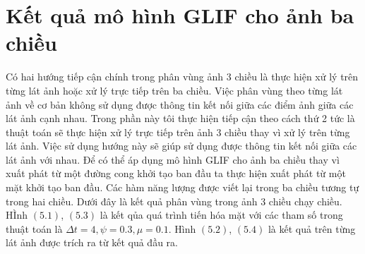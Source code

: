 \documentclass[12pt, oneside, a4paper]{book}
\begin{document}
\section{Kết quả mô hình GLIF cho ảnh ba chiều}
Có hai hướng tiếp cận chính trong phân vùng ảnh 3 chiều là thực hiện xử lý trên từng lát ảnh hoặc xử lý trực tiếp trên ba chiều. Việc phân vùng theo từng lát ảnh về cơ bản không sử dụng được thông tin kết nối giữa các điểm ảnh giữa các lát ảnh cạnh nhau. Trong phần này tôi thực hiện tiếp cận theo cách thứ 2 tức là thuật toán sẽ thực hiện xử lý trực tiếp trên ảnh 3 chiều thay vì xử lý trên từng lát ảnh. Việc sử dụng hướng này sẽ giúp sử dụng được thông tin kết nối giữa các lát ảnh với nhau.
Để có thể áp dụng mô hình GLIF cho ảnh ba chiều thay vì xuất phát từ một đường cong khởi tạo ban đầu ta thực hiện xuất phát từ một mặt khởi tạo ban đầu. Các hàm năng lượng được viết lại trong ba chiều tương tự trong hai chiều. Dưới đây là kết quả phân vùng trong ảnh 3 chiều chạy chiều. HÌnh $(5.1)$, $(5.3)$ là kết qủa quá trình tiến hóa mặt  với các tham số trong thuật toán là $\Delta t=4,\psi=0.3,\mu=0.1 $. Hình $(5.2)$, $(5.4)$ là kết quả trên từng lát ảnh được trích ra từ kết quả đầu ra.
\end{document}
